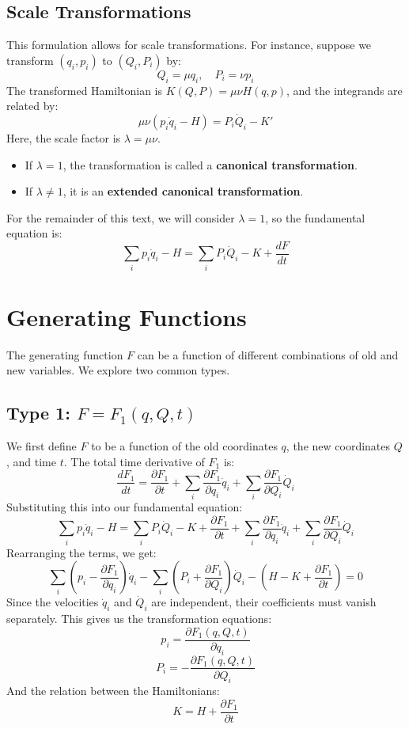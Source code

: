 \documentclass[12pt]{article}
\begin{document}
	\subsection{Scale Transformations}
	This formulation allows for scale transformations. For instance, suppose we transform $(q_i, p_i)$ to $(Q_i, P_i)$ by:
	$$
	Q_i = \mu q_i, \quad P_i = \nu p_i
	$$
	The transformed Hamiltonian is $K(Q, P) = \mu \nu H(q, p)$, and the integrands are related by:
	$$
	\mu \nu (p_i \dot{q}_i - H) = P_i \dot{Q}_i - K'
	$$
	Here, the scale factor is $\lambda = \mu\nu$.
	\begin{itemize}
		\item If $\lambda=1$, the transformation is called a \textbf{canonical transformation}.
		\item If $\lambda \neq 1$, it is an \textbf{extended canonical transformation}.
	\end{itemize}
	For the remainder of this text, we will consider $\lambda=1$, so the fundamental equation is:
	$$
	\sum_i p_i \dot{q}_i - H = \sum_i P_i \dot{Q}_i - K + \frac{dF}{dt}
	$$
	
	\section{Generating Functions}
	The generating function $F$ can be a function of different combinations of old and new variables. We explore two common types.
	
	\subsection{Type 1: $F = F_1(q, Q, t)$}
	We first define $F$ to be a function of the old coordinates $q$, the new coordinates $Q$, and time $t$. The total time derivative of $F_1$ is:
	$$
	\frac{dF_1}{dt} = \frac{\partial F_1}{\partial t} + \sum_i \frac{\partial F_1}{\partial q_i} \dot{q}_i + \sum_i \frac{\partial F_1}{\partial Q_i} \dot{Q}_i
	$$
	Substituting this into our fundamental equation:
	$$
	\sum_i p_i \dot{q}_i - H = \sum_i P_i \dot{Q}_i - K + \frac{\partial F_1}{\partial t} + \sum_i \frac{\partial F_1}{\partial q_i} \dot{q}_i + \sum_i \frac{\partial F_1}{\partial Q_i} \dot{Q}_i
	$$
	Rearranging the terms, we get:
	$$
	\sum_i \left( p_i - \frac{\partial F_1}{\partial q_i} \right) \dot{q}_i - \sum_i \left( P_i + \frac{\partial F_1}{\partial Q_i} \right) \dot{Q}_i - \left( H - K + \frac{\partial F_1}{\partial t} \right) = 0
	$$
	Since the velocities $\dot{q}_i$ and $\dot{Q}_i$ are independent, their coefficients must vanish separately. This gives us the transformation equations:
	$$
	p_i = \frac{\partial F_1(q, Q, t)}{\partial q_i}
	$$
	$$
	P_i = -\frac{\partial F_1(q, Q, t)}{\partial Q_i}
	$$
	And the relation between the Hamiltonians:
	$$
	K = H + \frac{\partial F_1}{\partial t}
	$$
	
\end{document}
